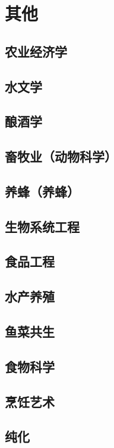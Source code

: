 \documentclass[UTF8]{../ApplicationUniverse}
\begin{document}
\chapter{其他}
\section{农业经济学}
\section{水文学}
\section{酿酒学}
\section{畜牧业（动物科学）}
\section{养蜂（养蜂）}
\section{生物系统工程}
\section{食品工程}
\section{水产养殖}
\section{鱼菜共生}
\section{食物科学}
\section{烹饪艺术}
\section{纯化}
\end{document}
